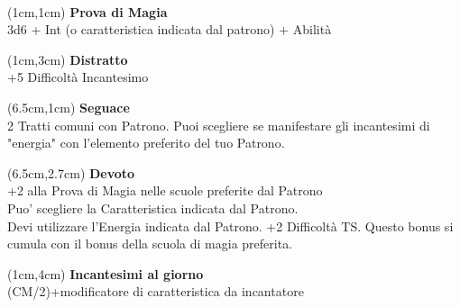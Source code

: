 \documentclass[a4paper,12 pt,openany]{book}
\begin{document}
	~\newpage

\begin{textblock*}{5cm}(1cm,1cm) %
		\textbf{Prova di Magia}\\
3d6 + Int (o caratteristica indicata dal patrono) + Abilità		
	\end{textblock*}

\begin{textblock*}{5cm}(1cm,3cm) %
	\textbf{Distratto}\\
	+5 Difficoltà Incantesimo
\end{textblock*}

\begin{textblock*}{13.5cm}(6.5cm,1cm) %
	\textbf{Seguace}\\
2 Tratti comuni con Patrono. Puoi scegliere se manifestare gli incantesimi di "energia" con l'elemento preferito del tuo Patrono.\\
\end{textblock*}

\begin{textblock*}{13.5cm}(6.5cm,2.7cm) %
	\textbf{Devoto}\\
+2 alla Prova di Magia nelle scuole preferite dal Patrono\\
Puo' scegliere la Caratteristica indicata dal Patrono.\\
Devi utilizzare l'Energia indicata dal Patrono. +2 Difficoltà TS. Questo bonus si cumula con il bonus della scuola di magia preferita.
\end{textblock*}
	
\begin{textblock*}{5cm}(1cm,4cm) %
\textbf{Incantesimi al giorno}\\
(CM/2)+modificatore di caratteristica da incantatore
\end{textblock*}	
	 

	
\end{document}
